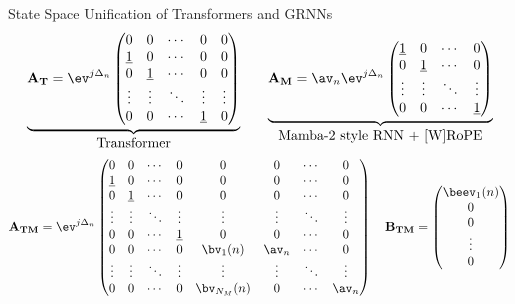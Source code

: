 \begin{slide}[\slideopts,toc={Unified State Space}]{State Space Unification of Transformers and GRNNs}
\vspace{-1em}
\begin{equation*}
\begin{array}{cc}
\underbrace{
\mathbf{A_T} = \ev^{j\Delta_n} \begin{pmatrix}
0 & 0 & \cdots & 0 & 0 \\
\onevec & 0 & \cdots & 0 & 0 \\
0 & \onevec & \cdots & 0 & 0 \\
\vdots & \vdots & \ddots & \vdots & \vdots \\
0 & 0 & \cdots & \onevec & 0
\end{pmatrix}
}_{\mbox{Transformer}}
&\quad
\underbrace{
\mathbf{A_M} = \av_n \ev^{j\Delta_n} \begin{pmatrix}
\onevec & 0 & \cdots & 0 \\
0 & \onevec & \cdots & 0 \\
\vdots & \vdots & \ddots & \vdots \\
0 & 0 & \cdots & \onevec
\end{pmatrix}
}_{\mbox{Mamba-2 style RNN + [W]RoPE}}
\end{array}
\end{equation*}
\[
\mathbf{A_{TM}} = \ev^{j\Delta_n} \begin{pmatrix}
0 & 0 & \cdots & 0 & 0 & 0 & \cdots & 0 \\
\onevec & 0 & \cdots & 0 & 0 & 0 & \cdots & 0 \\
0 & \onevec & \cdots & 0 & 0 & 0 & \cdots & 0 \\
\vdots & \vdots & \ddots & \vdots & \vdots & \vdots & \ddots & \vdots \\
0 & 0 & \cdots & \onevec & 0 & 0 & \cdots & 0 \\
0 & 0 & \cdots & 0 & \bv_{1}(n) & \av_n & \cdots & 0 \\
\vdots & \vdots & \ddots & \vdots & \vdots & \vdots & \ddots & \vdots \\
0 & 0 & \cdots & 0 & \bv_{N_M}(n) & 0 & \cdots & \av_n
\end{pmatrix}
\quad
\mathbf{B_{TM}} = \begin{pmatrix} \beev_1(n) \\ 0 \\ 0 \\ \vdots \\ 0 \end{pmatrix}
\]

\end{slide}

